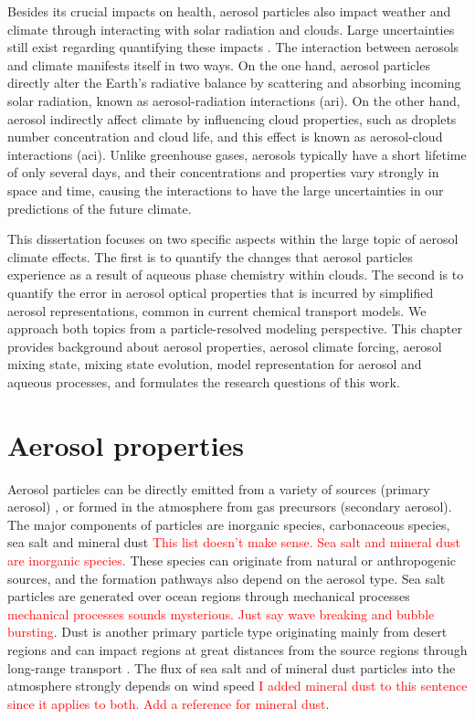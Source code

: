 \documentclass[edeposit,fullpage]{uiucthesis2009}
\begin{document}
Besides its crucial impacts on health, aerosol particles also impact
weather and climate through interacting with solar radiation and
clouds. Large uncertainties still exist regarding quantifying these
impacts \citep{IPCC_CHAPTER7, seinfeld2016improving, fan2016review,
  bellouin2020bounding}. The interaction between aerosols and climate
manifests itself in two ways. On the one hand, aerosol particles
directly alter the Earth's radiative balance by scattering and
absorbing incoming solar radiation, known as aerosol-radiation
interactions (ari). On the other hand, aerosol indirectly affect
climate by influencing cloud properties, such as droplets number
concentration and cloud life, and this effect is known as
aerosol-cloud interactions (aci). Unlike greenhouse gases, aerosols
typically have a short lifetime of only several days, and their
concentrations and properties vary strongly in space and time, causing
the interactions to have the large uncertainties in our predictions of
the future climate.

This dissertation focuses on two specific aspects within the large
topic of aerosol climate effects. The first is to quantify the changes
that aerosol particles experience as a result of aqueous phase
chemistry within clouds. The second is to quantify the error in
aerosol optical properties that is incurred by simplified aerosol
representations, common in current chemical transport models. We
approach both topics from a particle-resolved modeling
perspective. This chapter provides background about aerosol
properties, aerosol climate forcing, aerosol mixing state, mixing
state evolution, model representation for aerosol and aqueous
processes, and formulates the research questions of this work.

\section{Aerosol properties}
\label{cha1-1:aerosol-defi}
Aerosol particles can be directly emitted from a variety of sources
(primary aerosol) , or formed in the atmosphere from gas precursors
(secondary aerosol). The major components of particles are inorganic
species, carbonaceous species, sea salt and mineral dust
\textcolor{red}{This list doesn't make sense. Sea salt and mineral
  dust are inorganic species.} These species can originate from
natural or anthropogenic sources, and the formation pathways also
depend on the aerosol type. Sea salt particles are generated over
ocean regions through mechanical processes \textcolor{red}{mechanical
  processes sounds mysterious. Just say wave breaking and bubble
  bursting}. Dust is another primary particle type originating mainly
from desert regions and can impact regions at great distances from the
source regions through long-range transport
\citep{van2018mysterious,yu2021observation}. The flux of sea salt and
of mineral dust particles into the atmosphere strongly depends on wind
speed \citep{jaegle2011global, monahan1986model} \textcolor{red}{I
  added mineral dust to this sentence since it applies to both. Add a
  reference for mineral dust}.
\end{document}
